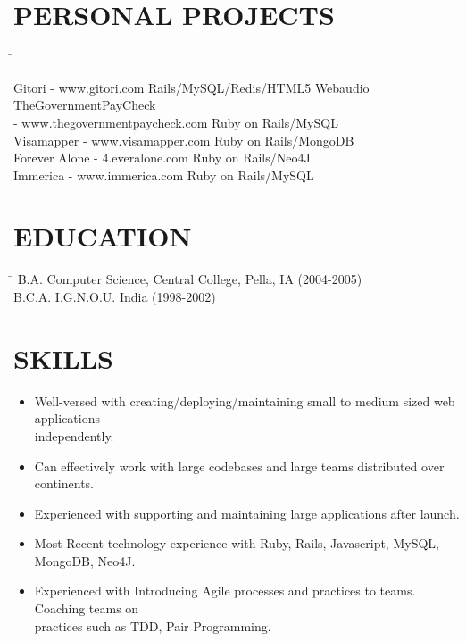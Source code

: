 \documentclass{res}
\begin{document}
\begin{resume}
\section{PERSONAL PROJECTS}  \vspace{-0.01in}   
   \begin{tabbing}
   \hspace{3.3in}\= \kill %

    Gitori - www.gitori.com   \>Rails/MySQL/Redis/HTML5 Webaudio \\

    TheGovernmentPayCheck \\- www.thegovernmentpaycheck.com   \>Ruby on Rails/MySQL\\

    Visamapper - www.visamapper.com   \>Ruby on Rails/MongoDB \\
 
    Forever Alone - 4.everalone.com \>Ruby on Rails/Neo4J \\

    Immerica - www.immerica.com \>Ruby on Rails/MySQL\\

\end{tabbing}

\section{EDUCATION}\vspace{0.05in}
\begin{tabbing}
\hspace{3.3in}\= \kill %
        B.A. Computer Science, Central College, Pella, IA  \>(2004-2005) \\
        B.C.A. I.G.N.O.U. India  \>(1998-2002) \\
\end{tabbing}
\vspace{0.01in}         
\section{SKILLS} \vspace{0.15in}         
 \begin{itemize} \itemsep 0pt  
 \setlength{\itemindent}{-1.8em}
\item Well-versed with creating/deploying/maintaining small to medium sized web applications\\ independently.
\item Can effectively work with large codebases and large teams distributed over continents.
\item Experienced with supporting and maintaining large applications after launch.
\item Most Recent technology experience with Ruby, Rails, Javascript, MySQL, MongoDB, Neo4J. 
\item Experienced with Introducing Agile processes and practices to teams. Coaching teams on \\practices such as TDD, Pair Programming.


\end{itemize}
\end{resume}
\end{document}
